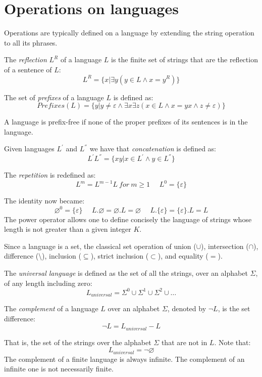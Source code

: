 \section{Operations on languages}

Operations are typically defined on a language by extending the string operation to all its phrases. 
\begin{definition}[Reflection]
    The \emph{reflection} $L^R$ of a language $L$ is the finite set of strings that are the reflection of a sentence of $L$: 
    \[L^R = \{ x | \exists y \left( y \in L \land x=y^R \right)\}\]
\end{definition}
\begin{definition}[Prefix]
    The set of \emph{prefixes} of a language $L$ is defined as: 
    \[Prefixes(L)=\{y | y \neq \varepsilon \land \exists x \exists z \left( x \in L \land x=yx \land z \neq \varepsilon \right)\}\]
\end{definition}
A language is prefix-free if none of the proper prefixes of its sentences is in the language. 
\begin{definition}[Concatenation]
    Given languages $L^{'}$ and $L^{''}$ we have that \emph{concatenation} is defined as: 
        \[L^{'}L^{''}=\{ xy | x \in L^{'} \land y \in L^{''} \}\]
\end{definition}
\begin{definition}[Repetition]
    The \emph{repetition} is redefined as: 
    \[L^m=L^{m-1}L \:for \: m \geq 1 \:\:\:\:\:\: L^0=\{ \varepsilon \}\]
\end{definition}
The identity now became: 
\[\varnothing ^0 = \{ \varepsilon \} \:\:\:\:\:\: L.\varnothing=\varnothing .L=\varnothing \:\:\:\:\:\: L.\{\varepsilon\}=\{\varepsilon\} .L=L\]
The power operator allows one to define concisely the language of strings whose length is not greater than a given integer $K$. 
\begin{definition}
    Since a language is a set, the classical set operation of union ($\cup$), intersection ($\cap$), difference ($ \setminus $), inclusion ($ \subseteq $), strict inclusion 
    ($ \subset $), and equality ($=$). 
\end{definition}
\begin{definition}
    The \emph{universal language} is defined as the set of all the strings, over an alphabet $\Sigma$, of any length including zero: 
    \[L_{universal}=\Sigma ^0 \cup \Sigma ^1 \cup \Sigma ^2 \cup \dots \]
\end{definition}
\begin{definition}[Complement]
    The \emph{complement} of a language $L$ over an alphabet $\Sigma$, denoted by $\lnot L$, is the set difference: 
        \[ \lnot L = L_{universal} - L\]
\end{definition}
That is, the set of the strings over the alphabet $\Sigma$ that are not in $L$. Note that: 
\[L_{universal} = \lnot \varnothing\]
The complement of a finite language is always infinite. The complement of an infinite one is not necessarily finite.   

